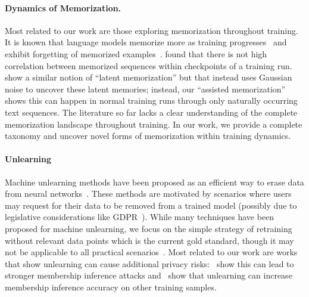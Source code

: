 \paragraph{Dynamics of Memorization.} 
Most related to our work are those exploring memorization throughout training. It is known that language models memorize more as training progresses~\citep{tirumala2022memorization, recite,huang-etal-2024-demystifying} and exhibit forgetting of memorized examples~\citep{jagielski2022measuring}. \citet{biderman2023emergent} found that there is not high correlation between memorized sequences within checkpoints of a training run. \citet{duan2024uncoveringlatentmemoriesassessing} show a similar notion of ``latent memorization'' but that instead  uses Gaussian noise to uncover these latent memories; instead, our ``assisted memorization'' shows this can happen in normal training runs through only naturally occurring text sequences. The literature so far lacks a clear understanding of the complete memorization landscape throughout training. In our work, we provide a complete taxonomy and uncover novel forms of memorization within training dynamics. 
\vspace{-1em}

\vspace{-1em}
\paragraph{Unlearning} 
Machine unlearning methods have been proposed as an efficient way to erase data from neural networks~\citep{sisa, approx_deletion, unlearning_auditing}. These methods are motivated by scenarios where users may request for their data to be removed from a trained model (possibly due to legislative considerations like GDPR~\citep{Fabbrini_Celeste_2020}). While many techniques have been proposed for machine unlearning, we focus on the simple strategy of retraining without relevant data points which is the current gold standard, though it may not be applicable to all practical scenarios~\citep{cooper2024machineunlearningdoesntthink}. Most related to our work are works that show unlearning can cause additional privacy risks:~\citet{jeopardize} show this can lead to stronger membership inference attacks and~\citet{onioneffect, hayes2024inexact} show that unlearning can increase membership inference accuracy on other training samples.